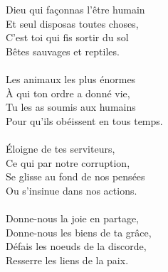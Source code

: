 Dieu qui façonnas l’être humain\\
Et seul disposas toutes choses,\\
C’est toi qui fis sortir du sol\\
Bêtes sauvages et reptiles.\\
\\
Les animaux les plus énormes\\
À qui ton ordre a donné vie,\\
Tu les as soumis aux humains\\
Pour qu'ils obéissent en tous temps.\\
\\
Éloigne de tes serviteurs,\\
Ce qui par notre corruption,\\
Se glisse au fond de nos pensées\\
Ou s’insinue dans nos actions.\\
\\
Donne-nous la joie en partage,\\
Donne-nous les biens de ta grâce,\\
Défais les noeuds de la discorde,\\
Resserre les liens de la paix.